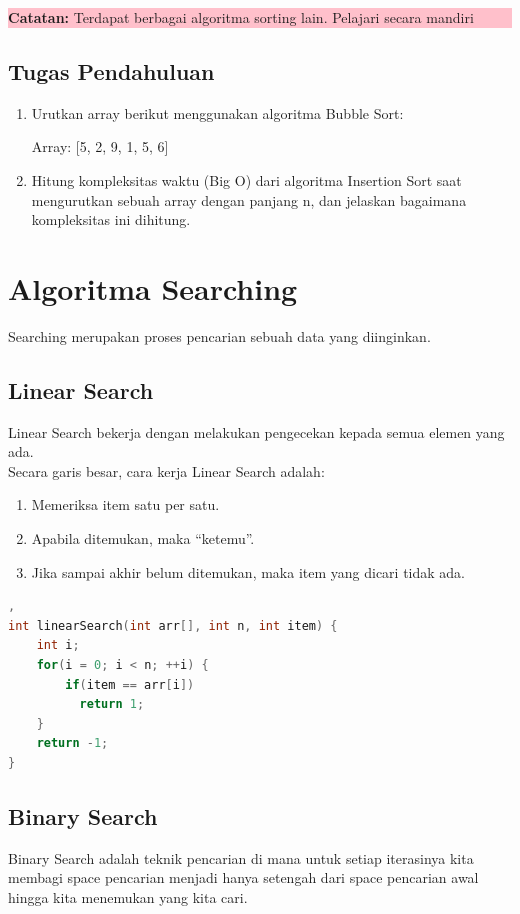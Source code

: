 \begin{center}
    \colorbox{pink}{\parbox{0.8\linewidth}{\textbf{Catatan:} Terdapat berbagai algoritma sorting lain. Pelajari secara mandiri}}
\end{center}

\subsection{Tugas Pendahuluan}
\begin{enumerate}
    \item Urutkan array berikut menggunakan algoritma Bubble Sort:

          Array: [5, 2, 9, 1, 5, 6]
    \item Hitung kompleksitas waktu (Big O) dari algoritma Insertion Sort saat mengurutkan sebuah array dengan panjang n, dan jelaskan bagaimana kompleksitas ini dihitung.
\end{enumerate}

\section{Algoritma Searching}
Searching merupakan proses pencarian sebuah data yang diinginkan.

\subsection{Linear Search}
Linear Search bekerja dengan melakukan pengecekan kepada semua elemen yang ada.\\
Secara garis besar, cara kerja Linear Search adalah:

\begin{enumerate}
    \item Memeriksa item satu per satu.
    \item Apabila ditemukan, maka “ketemu”.
    \item Jika sampai akhir belum ditemukan, maka item yang dicari tidak ada.
\end{enumerate}

\begin{lstlisting}[language=c,caption=Implementasi Linear Search], 
int linearSearch(int arr[], int n, int item) {
    int i;
    for(i = 0; i < n; ++i) {
        if(item == arr[i])
          return 1;
    }
    return -1;
}
\end{lstlisting}

\subsection{Binary Search}
Binary Search adalah teknik pencarian di mana untuk setiap iterasinya kita membagi space pencarian menjadi hanya setengah
dari space pencarian awal hingga kita menemukan yang kita cari.

